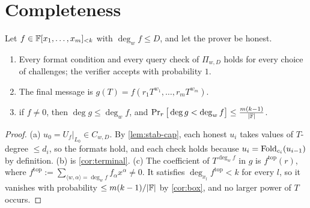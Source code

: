 \section{Completeness}

{\renewcommand{\theproposition}{P1}
\begin{proposition}\label{prop:complete}
Let $f\in\mathbb{F}[x_1,\dots,x_m]_{<k}$ with $\deg_wf\le D$, and let the prover be honest.
\begin{enumerate}
\item[(a)] Every format condition and every query check of $\Pi_{w,D}$ holds for every
choice of challenges; the verifier accepts with probability $1$.
\item[(b)] The final message is $g(T)=f(r_1T^{w_1},\dots,r_mT^{w_m})$.
\item[(c)] if $f\ne0$, then $\deg g\le\deg_wf$, and
$\Pr_r\big[\deg g<\deg_wf\big]\le\frac{m(k-1)}{|\mathbb{F}|}$.
\end{enumerate}
\end{proposition}}

\begin{proof}
(a) $u_0=U_f|_{L_0}\in C_{w,D}$. By \cref{lem:stab-cap}, each honest $u_i$ takes values of
$T$-degree $\le d_i$, so the formats hold, and each check holds because
$u_i=\mathrm{Fold}_{c_i}(u_{i-1})$ by definition.
(b) is \cref{cor:terminal}.
(c) The coefficient of $T^{\deg_wf}$ in $g$ is $f^{\mathrm{top}}(r)$, where
$f^{\mathrm{top}}:=\sum_{\langle w,\alpha\rangle=\deg_wf}f_\alpha x^\alpha\ne0$. It satisfies
$\deg_{x_l}f^{\mathrm{top}}<k$ for every $l$, so it vanishes with probability $\le m(k-1)/|\mathbb{F}|$ by
\cref{cor:box}, and no larger power of $T$ occurs.
\end{proof}
